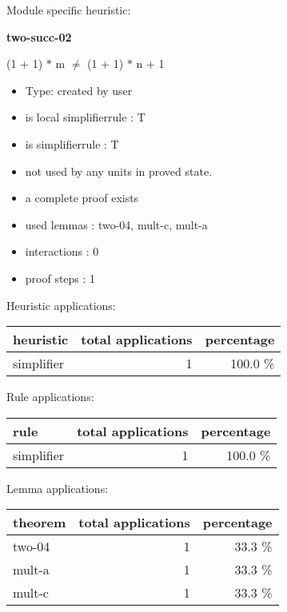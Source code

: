 \documentclass[a4paper]{article}
\begin{document}
Module specific heuristic:

\pagebreak

{\LARGE\bf two-succ-02}\label{lemma-two-succ-02}

\medskip

 \Fol (1 + 1) $*$ m $\neq$ (1 + 1) $*$ n + 1

\begin{itemize}

\item Type: created by user

\item is local simplifierrule : T
\item is simplifierrule : T
\item not used by any units in proved state.
\item       a complete proof exists
\item       used lemmas  : two-04, mult-c, mult-a
\item       interactions : 0
\item       proof steps  : 1
\end{itemize}

\medskip


Heuristic applications:

\begin{supertabular}{l|r|r}
heuristic	& total applications & percentage \\ \hline
simplifier & 1 & 100.0 \% \\

\end{supertabular}

Rule applications:

\begin{supertabular}{l|r|r}
rule	        & total applications & percentage \\ \hline
simplifier & 1 & 100.0 \% \\

\end{supertabular}

Lemma applications:

\begin{supertabular}{l|r|r}
theorem	        & total applications & percentage \\ \hline
two-04 & 1 & 33.3 \% \\
mult-a & 1 & 33.3 \% \\
mult-c & 1 & 33.3 \% \\

\end{supertabular}
\end{document}
